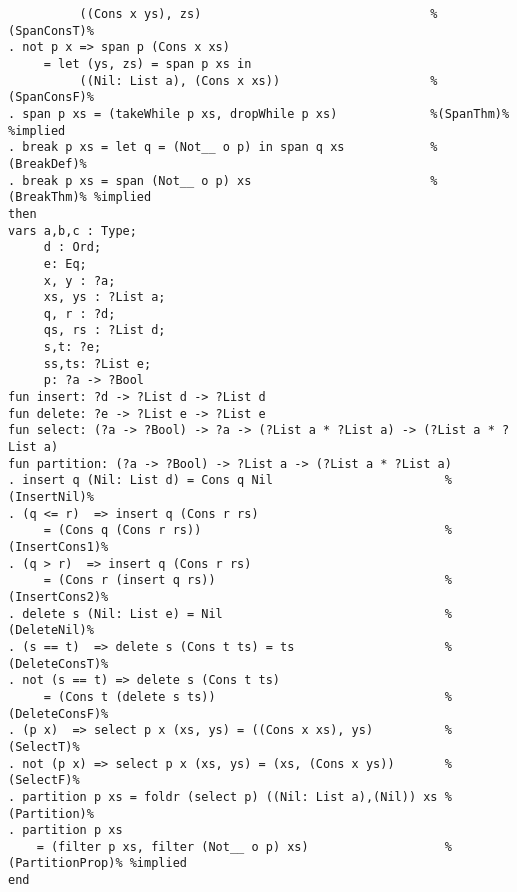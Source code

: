 \begin{Verbatim}
          ((Cons x ys), zs)                                %(SpanConsT)%
. not p x => span p (Cons x xs)
     = let (ys, zs) = span p xs in
          ((Nil: List a), (Cons x xs))                     %(SpanConsF)%
. span p xs = (takeWhile p xs, dropWhile p xs)             %(SpanThm)% %implied
. break p xs = let q = (Not__ o p) in span q xs            %(BreakDef)%
. break p xs = span (Not__ o p) xs                         %(BreakThm)% %implied
then
vars a,b,c : Type;
     d : Ord;
     e: Eq;
     x, y : ?a;
     xs, ys : ?List a;
     q, r : ?d;
     qs, rs : ?List d;
     s,t: ?e;
     ss,ts: ?List e;
     p: ?a -> ?Bool
fun insert: ?d -> ?List d -> ?List d
fun delete: ?e -> ?List e -> ?List e
fun select: (?a -> ?Bool) -> ?a -> (?List a * ?List a) -> (?List a * ?List a)
fun partition: (?a -> ?Bool) -> ?List a -> (?List a * ?List a)
. insert q (Nil: List d) = Cons q Nil                        %(InsertNil)%
. (q <= r)  => insert q (Cons r rs) 
     = (Cons q (Cons r rs))                                  %(InsertCons1)%
. (q > r)  => insert q (Cons r rs) 
     = (Cons r (insert q rs))                                %(InsertCons2)%
. delete s (Nil: List e) = Nil                               %(DeleteNil)%
. (s == t)  => delete s (Cons t ts) = ts                     %(DeleteConsT)%
. not (s == t) => delete s (Cons t ts) 
     = (Cons t (delete s ts))                                %(DeleteConsF)%
. (p x)  => select p x (xs, ys) = ((Cons x xs), ys)          %(SelectT)%
. not (p x) => select p x (xs, ys) = (xs, (Cons x ys))       %(SelectF)%
. partition p xs = foldr (select p) ((Nil: List a),(Nil)) xs %(Partition)%
. partition p xs 
    = (filter p xs, filter (Not__ o p) xs)                   %(PartitionProp)% %implied
end
\end{Verbatim}

